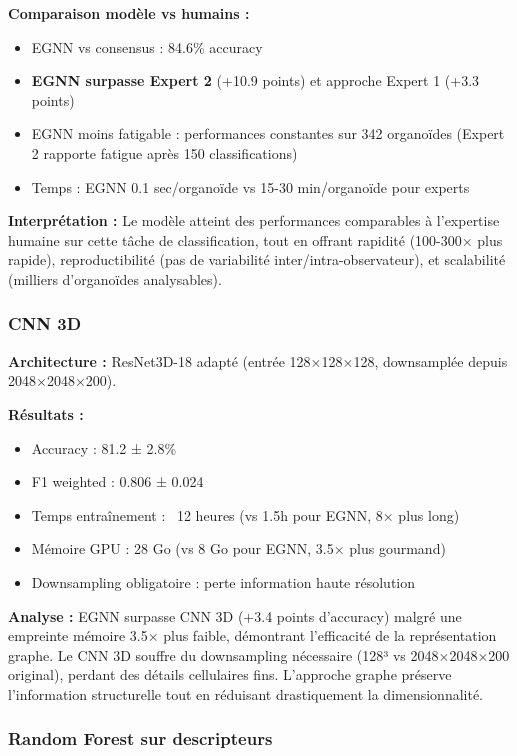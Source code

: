 \textbf{Comparaison modèle vs humains :}
\begin{itemize}
    \item EGNN vs consensus : 84.6\% accuracy
    \item \textbf{EGNN surpasse Expert 2} (+10.9 points) et approche Expert 1 (+3.3 points)
    \item EGNN moins fatigable : performances constantes sur 342 organoïdes (Expert 2 rapporte fatigue après 150 classifications)
    \item Temps : EGNN 0.1 sec/organoïde vs 15-30 min/organoïde pour experts
\end{itemize}

\textbf{Interprétation :}
Le modèle atteint des performances comparables à l'expertise humaine sur cette tâche de classification, tout en offrant rapidité (100-300× plus rapide), reproductibilité (pas de variabilité inter/intra-observateur), et scalabilité (milliers d'organoïdes analysables).

\subsubsection{CNN 3D}

\textbf{Architecture :}
ResNet3D-18 adapté (entrée 128×128×128, downsamplée depuis 2048×2048×200).

\textbf{Résultats :}
\begin{itemize}
    \item Accuracy : 81.2 ± 2.8\%
    \item F1 weighted : 0.806 ± 0.024
    \item Temps entraînement : ~12 heures (vs 1.5h pour EGNN, 8× plus long)
    \item Mémoire GPU : 28 Go (vs 8 Go pour EGNN, 3.5× plus gourmand)
    \item Downsampling obligatoire : perte information haute résolution
\end{itemize}

\textbf{Analyse :}
EGNN surpasse CNN 3D (+3.4 points d'accuracy) malgré une empreinte mémoire 3.5× plus faible, démontrant l'efficacité de la représentation graphe. Le CNN 3D souffre du downsampling nécessaire (128³ vs 2048×2048×200 original), perdant des détails cellulaires fins. L'approche graphe préserve l'information structurelle tout en réduisant drastiquement la dimensionnalité.

\subsubsection{Random Forest sur descripteurs}

